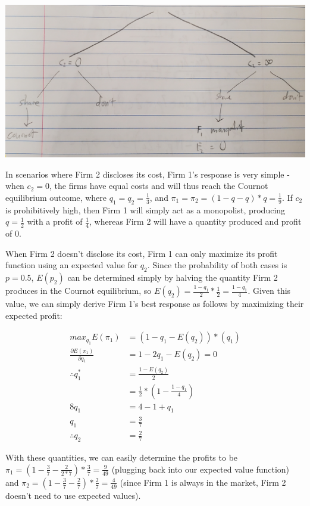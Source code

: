 \documentclass[12pt,letterpaper]{article}
\begin{document}
\begin{enumerate}
\begin{enumerate}
    \includegraphics[scale=0.15]{game-tree.jpg}
                                          
    In scenarios where Firm 2 discloses its cost, Firm 1's response is very simple - when $c_2 = 0$, the firms have equal costs and will thus reach the Cournot equilibrium outcome, where $q_1 = q_2 = \frac{1}{3}$, and $\pi_1 = \pi_2 = (1-q -q)* q= \frac{1}{9}$. If $c_2$ is prohibitively high, then Firm 1 will simply act as a monopolist, producing $q=\frac{1}{2}$ with a profit of $\frac{1}{4}$, whereas Firm 2 will have a quantity produced and profit of 0.
    
    When Firm 2 doesn't disclose its cost, Firm 1 can only maximize its profit function using an expected value for $q_2$. Since the probability of both cases is $p=0.5$, $E(p_2)$ can be determined simply by halving the quantity Firm 2 produces in the Cournot equilibrium, so $E(q_2) = \frac{1-q_1}{2} * \frac{1}{2} = \frac{1-q_1}{4}$. Given this value, we can simply derive Firm 1's best response as follows by maximizing their expected profit:
    
    \begin{align*}
        max_{q_1} E(\pi_1) &= (1 - q_1 - E(q_2)) * (q_1) \\
        \frac{\partial E(\pi_1)}{\partial q_1} &= 1 - 2q_1 - E(q_2) = 0 \\
        \therefore q_1^* &= \frac{1 - E(q_2)}{2} \\
        &= \frac{1}{2} * (1 - \frac{1-q_1}{4}) \\
        8q_1 &= 4 - 1 + q_1 \\
        q_1 &= \frac{3}{7} \\
        \therefore q_2 &= \frac{2}{7}
    \end{align*}
    
    With these quantities, we can easily determine the profits to be $\pi_1 = (1 - \frac{3}{7} - \frac{2}{2*7}) * \frac{3}{7} = \frac{9}{49}$ (plugging back into our expected value function) and $\pi_2 = (1 - \frac{3}{7} - \frac{2}{7}) * \frac{2}{7} = \frac{4}{49}$ (since Firm 1 is always in the market, Firm 2 doesn't need to use expected values).
    

\end{enumerate}
\end{enumerate}
\end{document}
